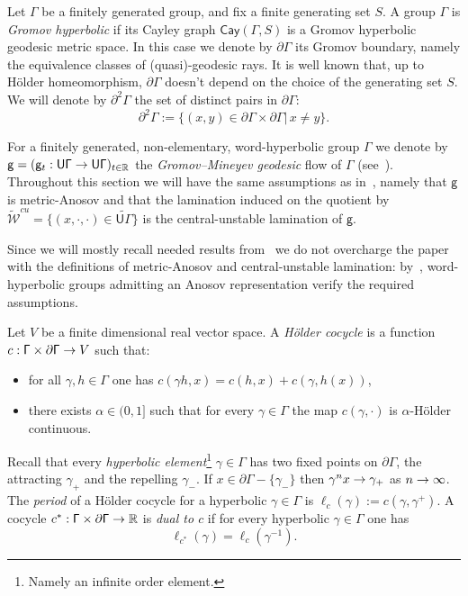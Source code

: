 \documentclass[AHL,Unicode,longabstracts,MathTools]{cedram}
\renewcommand{\sf}[1]{{\mathsf{#1}}}
\newcommand{\G}{\sf{\Gamma}}
\newcommand{\cal}{\mathcal}
\newcommand{\R}{\mathbb{R}}
\newcommand{\g}{\gamma}
\newcommand{\bord}{\partial}
\renewcommand{\/}{\backslash}
\newcommand{\<}{\langle}
\renewcommand{\>}{\rangle}
\renewcommand*{\to}{\mathchoice{\longrightarrow}{\rightarrow}{\rightarrow}{\rightarrow}}
\begin{document}
Let $\G$ be a finitely generated group, and fix a finite generating set $S$. A group $\G$ is \emph{Gromov hyperbolic} if its Cayley graph $\sf{Cay}(\G, S)$ is a Gromov hyperbolic geodesic metric space. In this case we denote by $\bord\G$ its Gromov boundary, namely the equivalence classes of (quasi)-geodesic rays. It is well known that, up to H\"older homeomorphism, $\bord\G$ doesn't depend on the choice of the generating set $S$. We will denote by $\bord^2\G$ the set of distinct pairs in $\bord\G$:
\[
\bord^2\G:=\{(x,y)\in\bord\G\times\bord\G|\, x\neq y\}.
\]


For a finitely generated, non-elementary, word-hyperbolic group $\G$ we denote by $\sf g=(\sf g_t:\sf U\G\to\sf U\G)_{t\in\R}$ the \emph{Gromov--Mineyev geodesic} flow of $\G$ (see~\cite{gromov, mineyev}).
Throughout this section we will have the same assumptions as in~\cite[Section~3]{dichotomy}, namely that $\sf g$ is metric-Anosov and that the lamination induced on the quotient by $\widetilde{\cal W}^{cu}=\{(x,\cdot,\cdot)\in\widetilde{\sf U\G}\}$ is the central-unstable lamination of $\sf g$.

Since we will mostly recall needed results
from~\cite[Section~3]{dichotomy} we do not overcharge the paper with the definitions of metric-Anosov and central-unstable lamination: by~\cite{pressure}, %
word-hyperbolic groups admitting an Anosov representation verify the required assumptions.


\begin{defi}
Let $V$ be a finite dimensional real vector space. A \emph{H\"older cocycle} is a function $c:\G\times\bord\G\to V$ such that:
\begin{itemize}
\item for all $\g,h\in \G$ one has $c(\g h,x)=c(h,x)+c(\g,h(x))$,
\item there exists $\alpha\in(0,1]$ such that for every $\g\in\G$ the map $c(\g,\cdot)$ is $\alpha$-H\"older continuous.
\end{itemize}
\end{defi}



Recall that every \emph{hyperbolic element}\footnote{Namely an infinite order element.} $\g\in\G$ has two fixed points on $\bord\G$, the attracting $\g_+$ and the repelling $\g_-$. If $x\in\bord\G-\{\g_-\}$ then $\g^nx\to\g_+$ as $n\to\infty$. The \emph{period} of a H\"older cocycle for a hyperbolic $\g\in\G$ is $\ell_c(\g):=c(\g,\g^+)$. A cocycle $c^*:\G\times\bord\G\to\R$ is \emph{dual to $c$} if for every hyperbolic $\g\in\G$ one has
\[
\ell_{c^*}(\g)=\ell_c(\g^{-1}).
\]
\end{document}
